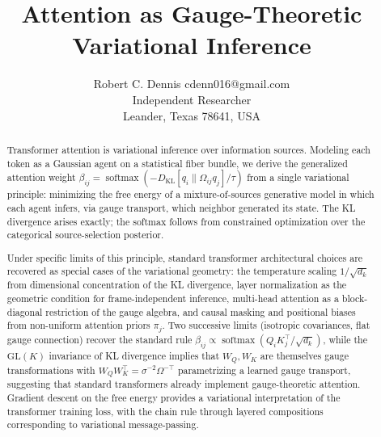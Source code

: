 \documentclass[twoside,11pt]{article}
\begin{document}

\title{Attention as Gauge-Theoretic Variational Inference}

\author{\name Robert C. Dennis \email cdenn016@gmail.com \\
       \addr Independent Researcher\\
       \addr Leander, Texas 78641, USA}


\maketitle

\begin{abstract}
Transformer attention is variational inference over information sources. Modeling each token as a Gaussian agent on a statistical fiber bundle, we derive the generalized attention weight $\beta_{ij} = \operatorname{softmax}(-D_{\mathrm{KL}}[q_i \| \Omega_{ij} q_j] / \tau)$ from a single variational principle: minimizing the free energy of a mixture-of-sources generative model in which each agent infers, via gauge transport, which neighbor generated its state. The KL divergence arises exactly; the softmax follows from constrained optimization over the categorical source-selection posterior.

Under specific limits of this principle, standard transformer architectural choices are recovered as special cases of the variational geometry: the temperature scaling $1/\sqrt{d_k}$ from dimensional concentration of the KL divergence, layer normalization as the geometric condition for frame-independent inference, multi-head attention as a block-diagonal restriction of the gauge algebra, and causal masking and positional biases from non-uniform attention priors $\pi_j$. Two successive limits (isotropic covariances, flat gauge connection) recover the standard rule $\beta_{ij} \propto \operatorname{softmax}(Q_i K_j^\top / \sqrt{d_k})$, while the $\mathrm{GL}(K)$ invariance of KL divergence implies that $W_Q, W_K$ are themselves gauge transformations with $W_Q W_K^\top = \sigma^{-2}\Omega^{-\top}$ parametrizing a learned gauge transport, suggesting that standard transformers already implement gauge-theoretic attention. Gradient descent on the free energy provides a variational interpretation of the transformer training loss, with the chain rule through layered compositions corresponding to variational message-passing.


\end{abstract}
\end{document}
